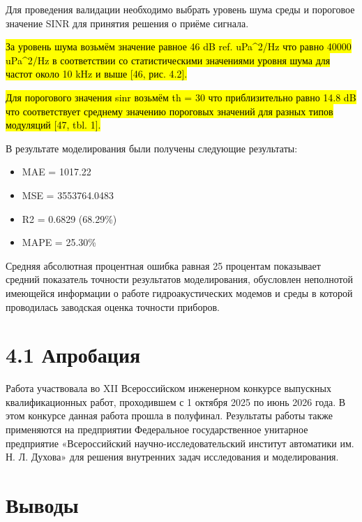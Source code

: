 Для проведения валидации необходимо выбрать уровень шума среды и
пороговое значение SINR для принятия решения о приёме сигнала.\hl{}

\hl{За уровень шума возьмём значение равное 46 dB ref. uPa\^{}2/Hz что
равно 40000 uPa\^{}2/Hz в соответствии со статистическими значениями
уровня шума для частот около 10 kHz и выше {[}46, рис. 4.2{]}.}

\hl{Для порогового значения sinr возьмём th = 30 что приблизительно
равно 14.8 dB что соответствует среднему значению пороговых значений для
разных типов модуляций {[}47, tbl. 1{]}.}

В результате моделирования были получены следующие результаты:

\begin{itemize}
\item
  MAE = 1017.22
\item
  MSE = 3553764.0483
\item
  R2 = 0.6829 (68.29\%)
\item
  MAPE = 25.30\%
\end{itemize}

Средняя абсолютная процентная ошибка равная 25 процентам показывает
средний показатель точности результатов моделирования, обусловлен
неполнотой имеющейся информации о работе гидроакустических модемов и
среды в которой проводилась заводская оценка точности приборов.\hl{}

\section*{4.1
Апробация}\label{ux430ux43fux440ux43eux431ux430ux446ux438ux44f}

Работа участвовала во XII Всероссийском инженерном конкурсе выпускных
квалификационных работ, проходившем с 1 октября 2025 по июнь 2026 года.
В этом конкурсе данная работа прошла в полуфинал. Результаты работы
также применяются на предприятии Федеральное государственное унитарное
предприятие «Всероссийский научно-исследовательский институт автоматики
им. Н. Л. Духова» для решения внутренних задач исследования и
моделирования.\hl{}

\hl{}

\section*{Выводы}\label{ux432ux44bux432ux43eux434ux44b-1}

